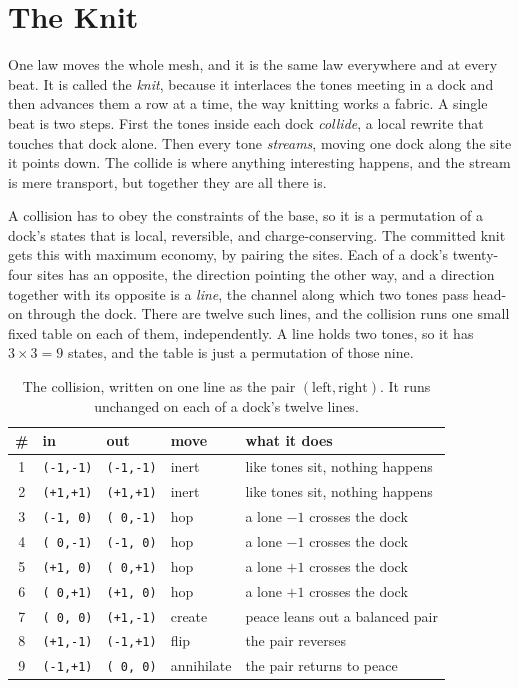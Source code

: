 \section{The Knit}

One law moves the whole mesh, and it is the same law everywhere and at every beat. It is called the \emph{knit}, because it interlaces the tones meeting in a dock and then advances them a row at a time, the way knitting works a fabric. A single beat is two steps. First the tones inside each dock \emph{collide}, a local rewrite that touches that dock alone. Then every tone \emph{streams}, moving one dock along the site it points down. The collide is where anything interesting happens, and the stream is mere transport, but together they are all there is.

A collision has to obey the constraints of the base, so it is a permutation of a dock's states that is local, reversible, and charge-conserving. The committed knit gets this with maximum economy, by pairing the sites. Each of a dock's twenty-four sites has an opposite, the direction pointing the other way, and a direction together with its opposite is a \emph{line}, the channel along which two tones pass head-on through the dock. There are twelve such lines, and the collision runs one small fixed table on each of them, independently. A line holds two tones, so it has $3 \times 3 = 9$ states, and the table is just a permutation of those nine.

\begin{table}[ht]
\centering
\begin{tabular}{@{}clllp{}@{}}
\toprule
\# & in & out & move & what it does \\
\midrule
1 & \texttt{(-1,-1)} & \texttt{(-1,-1)} & inert & like tones sit, nothing happens \\
2 & \texttt{(+1,+1)} & \texttt{(+1,+1)} & inert & like tones sit, nothing happens \\
3 & \texttt{(-1,~0)} & \texttt{(~0,-1)} & hop & a lone $-1$ crosses the dock \\
4 & \texttt{(~0,-1)} & \texttt{(-1,~0)} & hop & a lone $-1$ crosses the dock \\
5 & \texttt{(+1,~0)} & \texttt{(~0,+1)} & hop & a lone $+1$ crosses the dock \\
6 & \texttt{(~0,+1)} & \texttt{(+1,~0)} & hop & a lone $+1$ crosses the dock \\
7 & \texttt{(~0,~0)} & \texttt{(+1,-1)} & create & peace leans out a balanced pair \\
8 & \texttt{(+1,-1)} & \texttt{(-1,+1)} & flip & the pair reverses \\
9 & \texttt{(-1,+1)} & \texttt{(~0,~0)} & annihilate & the pair returns to peace \\
\bottomrule
\end{tabular}
\caption{The collision, written on one line as the pair $(\text{left}, \text{right})$. It runs unchanged on each of a dock's twelve lines.}
\label{tab:collision}
\end{table}

